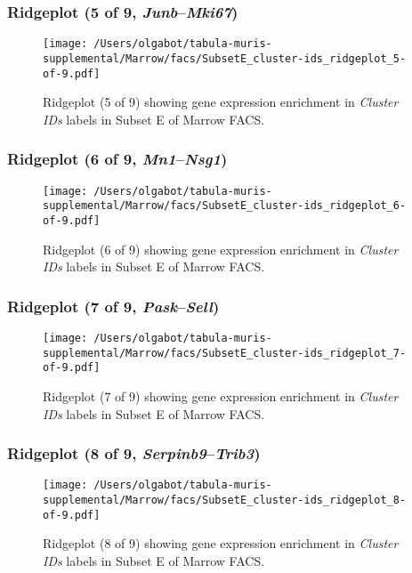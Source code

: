 \clearpage

\subsubsection{Ridgeplot (5 of 9, \emph{Junb}--\emph{Mki67})}
\begin{figure}[h]
\centering
\texttt{[image: /Users/olgabot/tabula-muris-supplemental/Marrow/facs/SubsetE\_cluster-ids\_ridgeplot\_5-of-9.pdf]}

\caption{ Ridgeplot (5 of 9)  showing gene expression enrichment in \emph{Cluster IDs} labels in Subset E of Marrow FACS. }
\end{figure}


\clearpage

\subsubsection{Ridgeplot (6 of 9, \emph{Mn1}--\emph{Nsg1})}
\begin{figure}[h]
\centering
\texttt{[image: /Users/olgabot/tabula-muris-supplemental/Marrow/facs/SubsetE\_cluster-ids\_ridgeplot\_6-of-9.pdf]}

\caption{ Ridgeplot (6 of 9)  showing gene expression enrichment in \emph{Cluster IDs} labels in Subset E of Marrow FACS. }
\end{figure}


\clearpage

\subsubsection{Ridgeplot (7 of 9, \emph{Pask}--\emph{Sell})}
\begin{figure}[h]
\centering
\texttt{[image: /Users/olgabot/tabula-muris-supplemental/Marrow/facs/SubsetE\_cluster-ids\_ridgeplot\_7-of-9.pdf]}

\caption{ Ridgeplot (7 of 9)  showing gene expression enrichment in \emph{Cluster IDs} labels in Subset E of Marrow FACS. }
\end{figure}


\clearpage

\subsubsection{Ridgeplot (8 of 9, \emph{Serpinb9}--\emph{Trib3})}
\begin{figure}[h]
\centering
\texttt{[image: /Users/olgabot/tabula-muris-supplemental/Marrow/facs/SubsetE\_cluster-ids\_ridgeplot\_8-of-9.pdf]}

\caption{ Ridgeplot (8 of 9)  showing gene expression enrichment in \emph{Cluster IDs} labels in Subset E of Marrow FACS. }
\end{figure}


